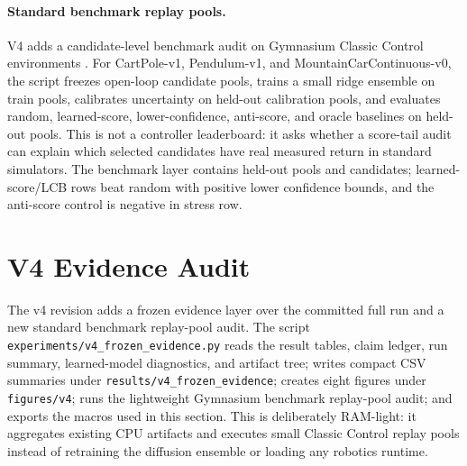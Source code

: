 \documentclass{article}
\begin{document}
\paragraph{Standard benchmark replay pools.}
V4 adds a candidate-level benchmark audit on Gymnasium Classic Control environments \citep{towers2024gymnasium}. For CartPole-v1, Pendulum-v1, and MountainCarContinuous-v0, the script freezes open-loop candidate pools, trains a small ridge ensemble on train pools, calibrates uncertainty on held-out calibration pools, and evaluates random, learned-score, lower-confidence, anti-score, and oracle baselines on held-out pools. This is not a controller leaderboard: it asks whether a score-tail audit can explain which selected candidates have real measured return in standard simulators. The benchmark layer contains \VFourDWMBenchmarkEvalPools{} held-out pools and \VFourDWMBenchmarkCandidateRows{} candidates; \VFourDWMBenchmarkPositiveCIRows{} learned-score/LCB rows beat random with positive lower confidence bounds, and the anti-score control is negative in \VFourDWMBenchmarkAntiNegativeRows{} stress row.

\begin{table}[t]
\centering
\caption{Held-out $N=64$ pilot repair gap closure.}
\label{tab:repair}
\end{table}

\section{V4 Evidence Audit}
\label{sec:v4-audit}

The v4 revision adds a frozen evidence layer over the committed full run and a
new standard benchmark replay-pool audit. The script
\texttt{experiments/v4\_frozen\_evidence.py} reads the result tables, claim
ledger, run summary, learned-model diagnostics, and artifact tree; writes
compact CSV summaries under \texttt{results/v4\_frozen\_evidence}; creates
eight figures under \texttt{figures/v4}; runs the lightweight Gymnasium
benchmark replay-pool audit; and exports the macros used in this section. This
is deliberately RAM-light: it aggregates existing CPU artifacts and executes
small Classic Control replay pools instead of retraining the diffusion
ensemble or loading any robotics runtime.
\end{document}
